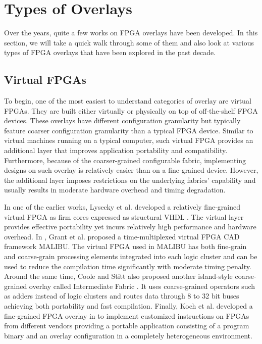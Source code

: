 \section{Types of Overlays}
%
Over the years, quite a few works on FPGA overlays have been developed.
In this section, we will take a quick walk through some of them and also look at various types of FPGA overlays that have been explored in the past decade.

\subsection{Virtual FPGAs}
To begin, one of the most easiest to understand categories of overlay are virtual FPGAs\cite{vFPGA,zuma2012,Grant2011Malibu,Coole2010Intermediate,Koch2013CI}. They are built either virtually or physically on top of off-the-shelf FPGA devices. These overlays have different configuration granularity but typically feature coarser configuration granularity than a typical FPGA device. Similar to virtual machines running on a typical computer, such virtual FPGA provides an additional layer that improves application portability and compatibility. Furthermore, because of the coarser-grained configurable fabric, implementing designs on such overlay is relatively easier than on a fine-grained device. However, the additional layer imposes restrictions on the underlying fabrics' capability and usually results in moderate hardware overhead and timing degradation.

In one of the earlier works, Lysecky et al. developed a relatively fine-grained virtual FPGA as firm cores expressed as structural VHDL \cite{vFPGA}. The virtual layer provides effective portability yet incurs relatively high performance and hardware overhead.
In \cite{Grant2011Malibu}, Grant et al. proposed a time-multiplexed virtual FPGA CAD framework MALIBU. The virtual FPGA used in MALIBU has both fine-grain and coarse-grain processing elements integrated into each logic cluster and can be used to reduce the compilation time significantly with moderate timing penalty. Around the same time, Coole and Stitt also proposed another island-style coarse-grained overlay called Intermediate Fabric \cite{Coole2010Intermediate}. It uses coarse-grained operators such as adders instead of logic clusters and routes data through 8 to 32 bit buses achieving both portability and fast compilation. Finally, Koch et al. developed a fine-grained FPGA overlay in \cite{Koch2013CI} to implement customized instructions on FPGAs from different vendors providing a portable application consisting of a program binary and an overlay configuration in a completely heterogeneous environment.

